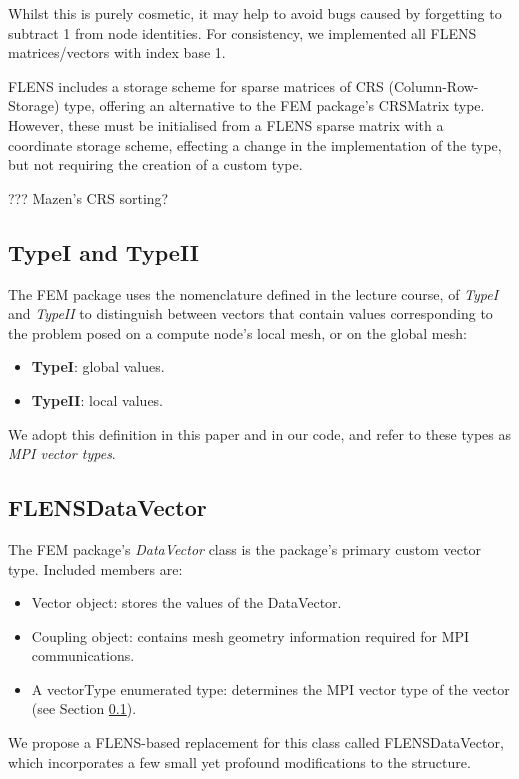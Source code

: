 Whilst this is purely cosmetic, it may help to avoid bugs caused by forgetting to subtract 1 from node identities. For consistency, we implemented all FLENS matrices/vectors with index base 1.

FLENS includes a storage scheme for sparse matrices of CRS (Column-Row-Storage) type, offering an alternative to the FEM package's CRSMatrix type. However, these must be initialised from a FLENS sparse matrix with a coordinate storage scheme, effecting a change in the implementation of the type, but not requiring the creation of a custom type.

??? Mazen's CRS sorting?

\subsection{TypeI and TypeII}\label{subsc:typeI_II}

The FEM package uses the nomenclature defined in the lecture course, of \emph{TypeI} and \emph{TypeII} to distinguish between vectors that contain values corresponding to the problem posed on a compute node's local mesh, or on the global mesh:

\begin {itemize}
   \item \textbf{TypeI}: global values.
   \item \textbf{TypeII}: local values.
\end{itemize}

We adopt this definition in this paper and in our code, and refer to these types as \emph{MPI vector types}.

\subsection{FLENSDataVector}

The FEM package's \emph{DataVector} class is the package's primary custom vector type. Included members are:
\begin{itemize}
   \item Vector object: stores the values of the DataVector.
   \item Coupling object: contains mesh geometry information required for MPI communications.
   \item A vectorType enumerated type: determines the MPI vector type of the vector (see Section \ref{subsc:typeI_II}).
\end{itemize}

We propose a FLENS-based replacement for this class called FLENSDataVector, which incorporates a few small yet profound modifications to the structure.

